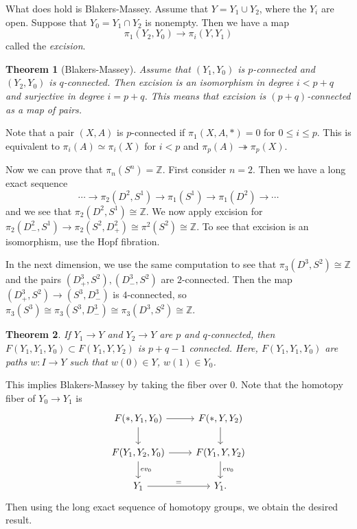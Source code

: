 \documentclass[leqno, openany]{memoir}
\newtheorem{thm}{Theorem}[section]
\theoremstyle{definition}
\theoremstyle{remark}
\theoremstyle{plain}
\theoremstyle{definition}
\theoremstyle{remark}
\newcommand{\Z}{\mathbb{Z}}
\begin{document}
What does hold is Blakers-Massey. Assume that $Y = Y_1 \cup Y_2$, where the
$Y_i$ are open. Suppose that $Y_0 = Y_1 \cap Y_2$ is nonempty. Then we have a
map \[ \pi_1(Y_2, Y_0) \to \pi_i(Y, Y_1) \] called the \textit{excision}. 

\begin{thm}[Blakers-Massey] Assume that $(Y_1, Y_0)$ is $p$-connected and
    $(Y_2, Y_0)$ is $q$-connected. Then excision is an isomorphism in degree $i
    < p+q$ and surjective in degree $i = p+q$. This means that excision is
    $(p+q)$-connected as a map of pairs.  \end{thm}

Note that a pair $(X,A)$ is $p$-connected if $\pi_1(X,A,*) = 0$ for $0 \leq i
\leq p$. This is equivalent to $\pi_i(A) \simeq \pi_i(X)$ for $i < p$ and
$\pi_p(A) \twoheadrightarrow \pi_p(X)$.

Now we can prove that $\pi_n(S^n) = \Z$. First consider $n = 2$. Then we have a
long exact sequence \[ \cdots \to \pi_2(D^2, S^1) \to \pi_1(S^1) \to \pi_1(D^2)
\to \cdots \] and we see that $\pi_2(D^2, S^1) \cong \Z$. We now apply excision
for $\pi_2(D^2_-, S^1) \to \pi_2(S^2, D^2_+) \cong \pi^2(S^2) \cong \Z$. To see
that excision is an isomorphism, use the Hopf fibration.

In the next dimension, we use the same computation to see that $\pi_3(D^3, S^2)
\cong \Z$ and the pairs $(D^3_+, S^2), (D^3_-, S^2)$ are $2$-connected. Then
the map $(D^3_+, S^2) \to (S^3, D^3_-)$ is $4$-connected, so $\pi_3(S^3) \cong
\pi_3(S^3, D^3_-) \cong \pi_3(D^3, S^2) \cong \Z$.

\begin{thm} If $Y_1 \to Y$ and $Y_2 \to Y$ are $p$ and $q$-connected, then
$F(Y_1, Y_1, Y_0) \subset F(Y_1, Y, Y_2)$ is $p + q - 1$ connected. Here,
$F(Y_1, Y_1, Y_0)$ are paths $w \colon I \to Y$ such that $w(0) \in Y$, $w(1)
\in Y_0$.  \end{thm}

This implies Blakers-Massey by taking the fiber over $0$. Note that the
homotopy fiber of $Y_0 \to Y_1$ is \begin{equation*} \begin{tikzcd} F(*, Y_1,
    Y_0) \arrow{d} \arrow{r} & F(*, Y, Y_2) \arrow{d} \\ F(Y_1, Y_2, Y_0)
    \arrow{r} \arrow{d}{ev_0} & F(Y_1, Y, Y_2) \arrow{d}{ev_0} \\ Y_1
\arrow{r}{=} & Y_1.  \end{tikzcd} \end{equation*} Then using the long exact
sequence of homotopy groups, we obtain the desired result.
\end{document}
